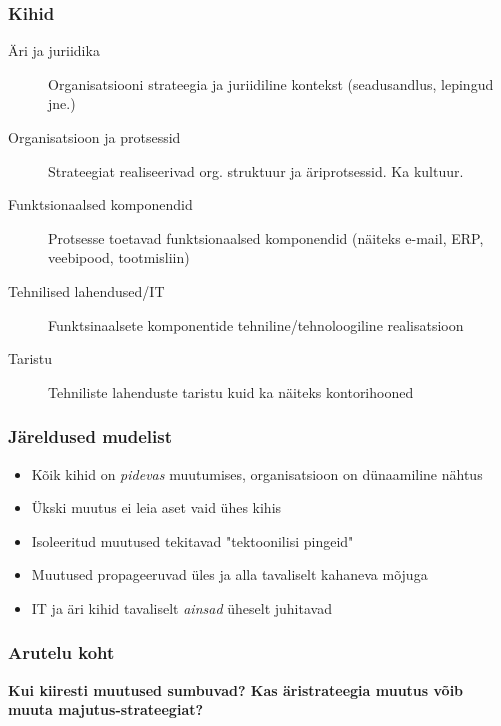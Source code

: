 \begin{frame}[fragile]
  \frametitle{Kihid}
  	\begin{description}
		\item[Äri ja juriidika] Organisatsiooni strateegia ja juriidiline kontekst (seadusandlus, lepingud jne.)
		\item[Organisatsioon ja protsessid] Strateegiat realiseerivad org. struktuur ja äriprotsessid. Ka kultuur.
		\item[Funktsionaalsed komponendid] Protsesse toetavad funktsionaalsed komponendid (näiteks e-mail, ERP, veebipood, tootmisliin)
		\item[Tehnilised lahendused/IT] Funktsinaalsete komponentide tehniline/tehnoloogiline realisatsioon
		\item[Taristu] Tehniliste lahenduste taristu kuid ka näiteks kontorihooned
	\end{description}
\end{frame}

\begin{frame}[fragile]
  \frametitle{Järeldused mudelist}
	\begin{itemize}
		\item Kõik kihid on \emph{pidevas} muutumises, organisatsioon on dünaamiline nähtus
		\item Ükski muutus ei leia aset vaid ühes kihis
		\item Isoleeritud muutused tekitavad "tektoonilisi pingeid"
		\item Muutused propageeruvad üles ja alla tavaliselt kahaneva mõjuga
		\item IT ja äri kihid tavaliselt \emph{ainsad} üheselt juhitavad
	\end{itemize}
\end{frame}

\begin{frame}[fragile]
  \frametitle{Arutelu koht}
		\begin{center}
			\textbf{Kui kiiresti muutused sumbuvad? Kas äristrateegia muutus võib muuta majutus-strateegiat?}
		\end{center}
\end{frame}

